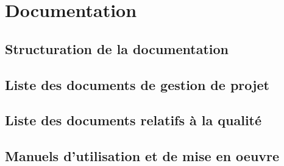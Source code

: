 \section{Documentation}

\subsection{Structuration de la documentation}

\subsection{Liste des documents de gestion de projet}

\subsection{Liste des documents relatifs à la qualité}

\subsection{Manuels d'utilisation et de mise en oeuvre}
